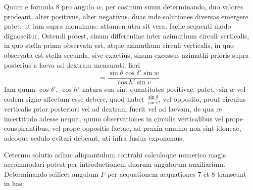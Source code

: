 Quum e formula $8$ pro angulo $w$, per cosinum suum determinando, duo valores prodeant, alter positivus, alter negativus, duas inde solutiones diversas emergere patet, ut iam supra monuimus: attamen utra sit vera, facile sequenti modo dignoscitur. Ostendi potest, sinum differentiae inter azimuthum circuli verticalis, in quo stella prima observata est, atque azimuthum circuli verticalis, in quo observata est stella secunda, sive exactius, sinum excessus azimuthi prioris supra posterius a laeva ad dextram mensurati, fieri
\[
=\frac{\sin\theta\cos\delta'\sin w}{\cos h'\sin v}
\]
Iam quum $\cos\delta',\ \cos h'$ natura sua sint quantitates positivae, patet, $\sin w$ vel eodem signo affectum esse debere, quod habet $\frac{\sin\theta}{\sin v}$, vel opposito, prout circulus verticalis prior posteriori vel ad dextram fuerit vel ad laevam, de qua re incertitudo adesse nequit, quum observationes in circulis verticalibus vel prope conspirantibus, vel prope oppositis factae, ad praxin omnino non sint idoneae, adeoque sedulo evitari debeant, uti infra fusius exponemus.

Ceterum solutio adhuc aliquantulum contrahi calculoque numerico magis accommodari potest per introductionem duorum angulorum auxiliarium. Determinando scilicet angulum $F$ per aequationem
aequationes $7$ et $8$ transeunt in has:

